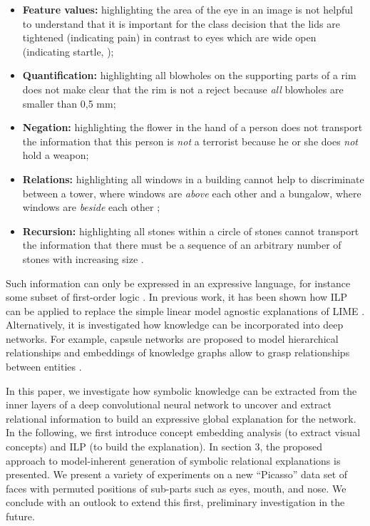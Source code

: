 \begin{itemize}

\item \textbf{Feature values:}
  highlighting the area of the eye in an image is not helpful to
  understand that it is important for the class decision that the lids
  are tightened (indicating pain) in contrast to eyes which are wide
  open (indicating startle, \cite{weitz2019deep});

\item \textbf{Quantification:}
  highlighting all blowholes on the supporting parts of a rim does not
  make clear that the rim is not a reject because \emph{all} blowholes
  are smaller than 0,5 mm;

\item \textbf{Negation:}
  highlighting the flower in the hand of a person does not transport
  the information that this person is \emph{not} a terrorist because
  he or she does \emph{not} hold a weapon; 

\item \textbf{Relations:}
  highlighting all windows in a building cannot help to discriminate
  between a tower, where windows are \emph{above} each other and a
  bungalow, where windows are \emph{beside} each other
  \cite{rabold2019enriching};

\item \textbf{Recursion:}
  highlighting all stones within a circle of stones cannot transport
  the information that there must be a sequence of an arbitrary number
  of stones with increasing size \cite{rabold2018explaining}.

\end{itemize}  

Such information can only be expressed in an expressive language, for
instance some subset of first-order logic
\cite{muggleton2018ultra}. In previous work, it has been shown how ILP
can be applied to replace the simple linear model agnostic
explanations of LIME
\cite{dai2019bridging,rabold2018explaining,rabold2019enriching,schmid2020mutual}. Alternatively,
it is investigated how knowledge can be incorporated into deep
networks. For example, capsule networks \cite{sabour2017dynamic} are
proposed to model hierarchical relationships and embeddings of
knowledge graphs allow to grasp relationships between entities
\cite{ji2015knowledge}.

In this paper, we investigate how symbolic knowledge can be extracted
from the inner layers of a deep convolutional neural network to
uncover and extract relational information to build an expressive
global explanation for the network. In the following, we first
introduce concept embedding analysis (to extract visual concepts) and
ILP (to build the explanation). In section 3, the proposed approach to
model-inherent generation of symbolic relational explanations %
is presented. We present a variety of experiments on a new ``Picasso''
data set of faces with permuted positions of sub-parts such as eyes,
mouth, and nose. We conclude with an outlook to extend this first,
preliminary investigation in the future.